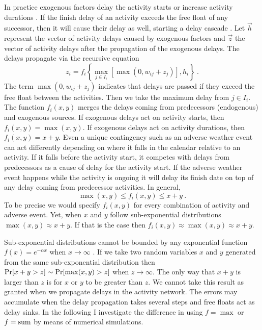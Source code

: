 \documentclass[reprint,aps,prl,amsmath,amssymb,superscriptaddress,showpacs]{revtex4-1}
\begin{document}
In practice exogenous factors delay the activity starts or increase activity durations \cite{park21}. If the finish delay of an activity exceeds the free float of any successor, then it will cause their delay as well, starting a delay cascade \cite{braha05,ellinas19}. Let $\vec{h}$ represent the vector of activity delays caused by exogenous factors and $\vec{z}$ the vector of activity delays after the propagation of the exogenous delays. The delays propagate via the recursive equation
\begin{equation}
z_i = f_i\left\{\max_{j\in I_i} \left[\max(0, w_{ij} + z_j)\right] , h_i\right\}\ .
\label{forward_delay} 
\end{equation}
% 
The term $\max(0,w_{ij}+z_j)$ indicates that delays are passed if they exceed the free float between the activities. Then we take the maximum delay from $j\in I_i$. The function $f_i(x,y)$ merges the delays coming from predecessors (endogenous) and exogenous sources. If exogenous delays act on activity starts, then $f_i(x,y)=\max(x,y)$. If exogenous delays act on activity durations, then $f_i(x,y)=x+y$. Even a unique contingency such as an adverse weather event can act differently depending on where it falls in the calendar relative to an activity. If it falls before the activity start, it competes with delays from predecessors as a cause of delay for the activity start. If the adverse weather event happens while the activity is ongoing it will delay its finish date on top of any delay coming from predecessor activities. In general,
%
\begin{equation}
\max(x,y)\leq f_i(x,y)\leq x+y\ .
\label{f_bounds}
\end{equation}
%
To be precise we would specify $f_i(x,y)$ for every combination of activity and adverse event. Yet, when $x$ and $y$ follow sub-exponential distributions $\max(x,y)\approx x+y$. If that is the case then $f_i(x,y)\approx \max(x,y)\approx x+y$. 

Sub-exponential distributions cannot be bounded by any exponential function $f(x) = e^{-\alpha x}$  when $x\rightarrow\infty$ \cite{foss13}. If we take two random variables $x$ and $y$ generated from the same sub-exponential distribution then ${\rm Pr}[x+y>z]\sim {\rm Pr}[\max(x,y)>z]$ when $z\rightarrow\infty$. The only way that $x+y$ is larger than $z$ is for $x$ or $y$ to be greater than $z$. We cannot take this result as granted when we propagate delays in the activity network. The errors may accumulate when the delay propagation takes several steps and free floats act as delay sinks. In the following I investigate the difference in using $f=\max$ or $f={\rm sum}$ by means of numerical simulations.
\end{document}
